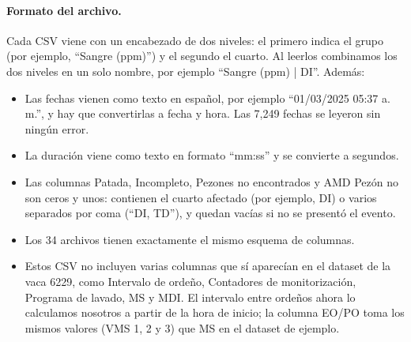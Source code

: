 \documentclass[11pt,letterpaper,DIV=12]{scrartcl}
\begin{document}
\paragraph{Formato del archivo.} Cada CSV viene con un encabezado de dos niveles: el primero indica el grupo (por ejemplo, ``Sangre (ppm)'') y el segundo el cuarto. Al leerlos combinamos los dos niveles en un solo nombre, por ejemplo ``Sangre (ppm) | DI''. Además:
\begin{itemize}
  \item Las fechas vienen como texto en español, por ejemplo ``01/03/2025 05:37 a.\,m.'', y hay que convertirlas a fecha y hora. Las 7,249 fechas se leyeron sin ningún error.
  \item La duración viene como texto en formato ``mm:ss'' y se convierte a segundos.
  \item Las columnas Patada, Incompleto, Pezones no encontrados y AMD Pezón no son ceros y unos: contienen el cuarto afectado (por ejemplo, DI) o varios separados por coma (``DI, TD''), y quedan vacías si no se presentó el evento.
  \item Los 34 archivos tienen exactamente el mismo esquema de columnas.
  \item Estos CSV no incluyen varias columnas que sí aparecían en el dataset de la vaca 6229, como Intervalo de ordeño, Contadores de monitorización, Programa de lavado, MS y MDI. El intervalo entre ordeños ahora lo calculamos nosotros a partir de la hora de inicio; la columna EO/PO toma los mismos valores (VMS 1, 2 y 3) que MS en el dataset de ejemplo.
\end{itemize}
\end{document}

